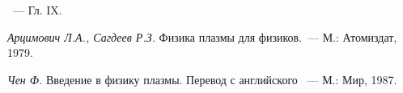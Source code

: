 \begin{lab:literature}
    \item \SivuhinIII~--- Гл. IX.
    
    \item \textit{Арцимович Л.А., Сагдеев Р.З.} Физика плазмы для физиков.~---
    М.: Атомиздат, 1979.
    
    \item \textit{Чен Ф.} Введение в физику плазмы. Перевод с английского ~--- М.:
    Мир, 1987.
\end{lab:literature}

